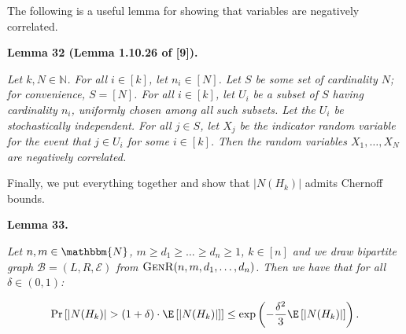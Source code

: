 


The following is a useful lemma for showing that variables are negatively correlated.\par





\par\medskip\noindent\textbf{\textbf{Lemma 32}\textbf{ }(Lemma 1.10.26 of [9])\textbf{.}}\par



\emph{Let $k,N\in\mathbb{N}$. For all $i\in[k]$, let $n_{i}\in[N]$.
Let $S$ be some set of cardinality $N$; for convenience, $S=[N]$.
For all $i\in[k]$, let $U_{i}$ be a subset of $S$ having cardinality $n_{i}$, uniformly chosen among all such subsets.
Let the $U_{i}$ be stochastically independent.
For all $j\in S$, let $X_{j}$ be the indicator random variable for the event that $j\in U_{i}$ for some $i\in[k]$.
Then the random variables $X_{1},\dots,X_{N}$ are negatively correlated.}\par






Finally, we put everything together and show that $|N(H_{k})|$ admits Chernoff bounds.\par





\par\medskip\noindent\textbf{\textbf{Lemma 33}\textbf{.}}\par



\emph{Let $n,m\in\mathbbm{N}$, $m\geq d_{1}\geq\dots\geq d_{n}\geq 1$, $k\in[n]$ and we draw bipartite graph $\mathcal{B}=(L,R,\mathcal{E})$ from $\textsc{GenR}(n,m,d_{1},\dots,d_{n})$.
Then we have that for all $\delta\in(0,1)$:}\par


\[\begin{gathered}
\displaystyle\Pr\left[|N(H_{k})|>(1+\delta)\cdot\E\left[|N(H_{k})|\right]\right]\leq\exp\left(-\frac{\delta^{2}}{3}\E\left[|N(H_{k})|\right]\right).
\end{gathered}\]






